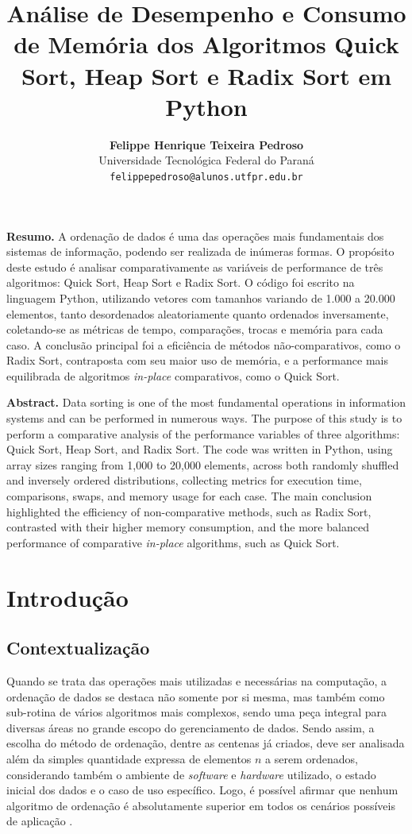 \documentclass[12pt,a4paper]{article}
\title{\textbf{Análise de Desempenho e Consumo de Memória dos Algoritmos Quick Sort, Heap Sort e Radix Sort em Python}}
\author{\textbf{Felippe Henrique Teixeira Pedroso}\\
Universidade Tecnológica Federal do Paraná\\
{\tt \small felippepedroso@alunos.utfpr.edu.br}}
\date{}
\renewenvironment{abstract}
  {\list{}{\setlength{\leftmargin}{0.8cm}\setlength{\rightmargin}{0.8cm}\fontsize{12}{14}\selectfont}\item\relax}
  {\endlist}
\begin{document}
\maketitle
\thispagestyle{empty}

\begin{abstract}
\noindent \textbf{Resumo.} 
A ordenação de dados é uma das operações mais fundamentais dos sistemas de informação, podendo ser realizada de inúmeras formas. O propósito deste estudo é analisar comparativamente as variáveis de performance de três algoritmos: Quick Sort, Heap Sort e Radix Sort. O código foi escrito na linguagem Python, utilizando vetores com tamanhos variando de 1.000 a 20.000 elementos, tanto desordenados aleatoriamente quanto ordenados inversamente, coletando-se as métricas de tempo, comparações, trocas e memória para cada caso. A conclusão principal foi a eficiência de métodos não-comparativos, como o Radix Sort, contraposta com seu maior uso de memória, e a performance mais equilibrada de algoritmos \textit{in-place} comparativos, como o Quick Sort.
\end{abstract}

\vspace{0.4cm}

\begin{abstract}
\noindent \textbf{Abstract.}
Data sorting is one of the most fundamental operations in information systems and can be performed in numerous ways. The purpose of this study is to perform a comparative analysis of the performance variables of three algorithms: Quick Sort, Heap Sort, and Radix Sort. The code was written in Python, using array sizes ranging from 1,000 to 20,000 elements, across both randomly shuffled and inversely ordered distributions, collecting metrics for execution time, comparisons, swaps, and memory usage for each case. The main conclusion highlighted the efficiency of non-comparative methods, such as Radix Sort, contrasted with their higher memory consumption, and the more balanced performance of comparative \textit{in-place} algorithms, such as Quick Sort.
\end{abstract}

\section{Introdução}
\subsection{Contextualização}
Quando se trata das operações mais utilizadas e necessárias na computação, a ordenação de dados se destaca não somente por si mesma, mas também como sub-rotina de vários algoritmos mais complexos, sendo uma peça integral para diversas áreas no grande escopo do gerenciamento de dados. Sendo assim, a escolha do método de ordenação, dentre as centenas já criados, deve ser analisada além da simples quantidade expressa de elementos $n$ a serem ordenados, considerando também o ambiente de \textit{software} e \textit{hardware} utilizado, o estado inicial dos dados e o caso de uso específico. Logo, é possível afirmar que nenhum algoritmo de ordenação é absolutamente superior em todos os cenários possíveis de aplicação \cite{cormen2012}.
\end{document}
